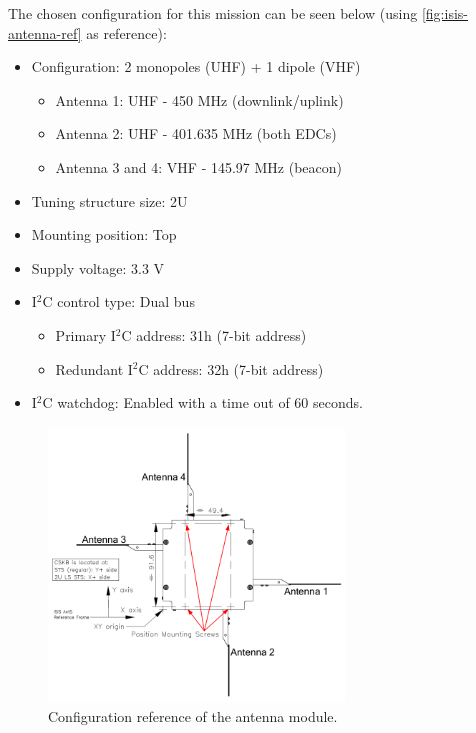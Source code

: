 The chosen configuration for this mission can be seen below (using \autoref{fig:isis-antenna-ref} as reference):

\begin{itemize}
    \item Configuration: 2 monopoles (UHF) + 1 dipole (VHF)
        \begin{itemize}
            \item Antenna 1: UHF - 450 MHz (downlink/uplink)
            \item Antenna 2: UHF - 401.635 MHz (both EDCs)
            \item Antenna 3 and 4: VHF - 145.97 MHz (beacon)
        \end{itemize}
    \item Tuning structure size: 2U
    \item Mounting position: Top
    \item Supply voltage: 3.3 V
    \item I$^{2}$C control type: Dual bus
        \begin{itemize}
            \item Primary I$^{2}$C address: 31h (7-bit address)
            \item Redundant I$^{2}$C address: 32h (7-bit address)
        \end{itemize}
    \item I$^{2}$C watchdog: Enabled with a time out of 60 seconds.
\end{itemize}

\begin{figure}[!ht]
    \begin{center}
        \includegraphics[width=0.7\textwidth]{figures/isis-antenna-ref}
        \caption{Configuration reference of the antenna module.}
        \label{fig:isis-antenna-ref}
    \end{center}
\end{figure}

